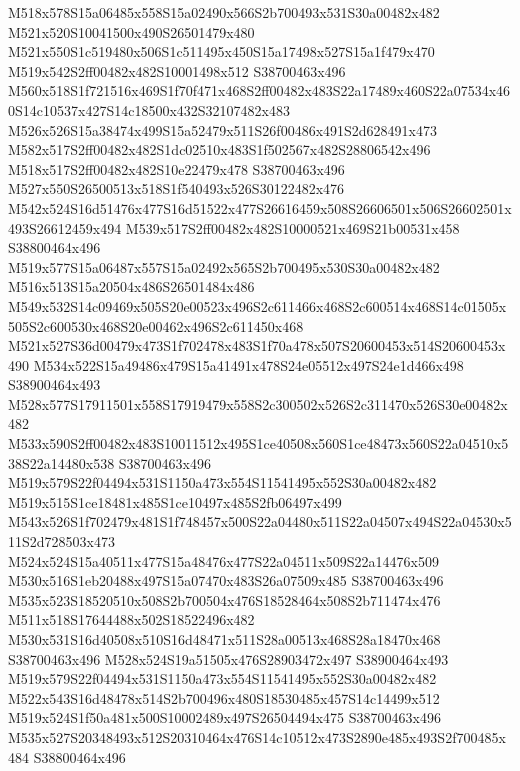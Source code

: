 \documentclass{article}
\begin{document}
\begin{multicols}{2}




M518x578S15a06485x558S15a02490x566S2b700493x531S30a00482x482 M521x520S10041500x490S26501479x480 M521x550S1c519480x506S1c511495x450S15a17498x527S15a1f479x470 M519x542S2ff00482x482S10001498x512 S38700463x496 M560x518S1f721516x469S1f70f471x468S2ff00482x483S22a17489x460S22a07534x460S14c10537x427S14c18500x432S32107482x483 M526x526S15a38474x499S15a52479x511S26f00486x491S2d628491x473 M582x517S2ff00482x482S1dc02510x483S1f502567x482S28806542x496 M518x517S2ff00482x482S10e22479x478 S38700463x496 M527x550S26500513x518S1f540493x526S30122482x476 M542x524S16d51476x477S16d51522x477S26616459x508S26606501x506S26602501x493S26612459x494 M539x517S2ff00482x482S10000521x469S21b00531x458 S38800464x496 M519x577S15a06487x557S15a02492x565S2b700495x530S30a00482x482 M516x513S15a20504x486S26501484x486 M549x532S14c09469x505S20e00523x496S2c611466x468S2c600514x468S14c01505x505S2c600530x468S20e00462x496S2c611450x468 M521x527S36d00479x473S1f702478x483S1f70a478x507S20600453x514S20600453x490 M534x522S15a49486x479S15a41491x478S24e05512x497S24e1d466x498 S38900464x493 M528x577S17911501x558S17919479x558S2c300502x526S2c311470x526S30e00482x482 M533x590S2ff00482x483S10011512x495S1ce40508x560S1ce48473x560S22a04510x538S22a14480x538 S38700463x496 M519x579S22f04494x531S1150a473x554S11541495x552S30a00482x482 M519x515S1ce18481x485S1ce10497x485S2fb06497x499 M543x526S1f702479x481S1f748457x500S22a04480x511S22a04507x494S22a04530x511S2d728503x473 M524x524S15a40511x477S15a48476x477S22a04511x509S22a14476x509 M530x516S1eb20488x497S15a07470x483S26a07509x485 S38700463x496 M535x523S18520510x508S2b700504x476S18528464x508S2b711474x476 M511x518S17644488x502S18522496x482 M530x531S16d40508x510S16d48471x511S28a00513x468S28a18470x468 S38700463x496 M528x524S19a51505x476S28903472x497 S38900464x493 M519x579S22f04494x531S1150a473x554S11541495x552S30a00482x482 M522x543S16d48478x514S2b700496x480S18530485x457S14c14499x512 M519x524S1f50a481x500S10002489x497S26504494x475 S38700463x496 M535x527S20348493x512S20310464x476S14c10512x473S2890e485x493S2f700485x484 S38800464x496


\end{multicols}
\end{document}
